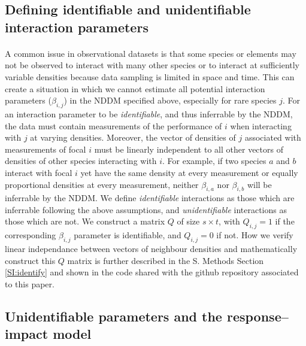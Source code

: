 \documentclass[a4,12pt]{article}
\begin{document}
\begin{refsection}
    \subsection{Defining identifiable and unidentifiable interaction parameters}
    \label{meth:id_params}

    \paragraph{}
    A common issue in observational datasets is that some species or elements may not be observed to interact with many other species or to interact at sufficiently variable densities because data sampling is limited in space and time. This can create a situation in which we cannot estimate all potential interaction parameters ($\beta_{i,j}$) in the NDDM specified above, especially for rare species $j$. For an interaction parameter to be \textit{identifiable}, and thus inferrable by the NDDM, the data must contain measurements of the performance of $i$ when interacting with $j$ at varying densities. Moreover, the vector of densities of $j$ associated with measurements of focal $i$ must be linearly independent to all other vectors of densities of other species interacting with $i$. For example, if two species $a$ and $b$ interact with focal $i$ yet have the same density at every measurement or equally proportional densities at every measurement, neither $\beta_{i, a}$ nor $\beta_{i, b}$ will be inferrable by the NDDM. We define \textit{identifiable} interactions as those which are inferrable following the above assumptions, and \textit{unidentifiable} interactions as those which are not. We construct a matrix $Q$ of size $s \times t$, with $Q_{i, j} = 1$ if the corresponding $\beta_{i, j}$ parameter is identifiable, and $Q_{i, j} = 0$ if not. How we verify linear independance between vectors of neighbour densities and mathematically construct this $Q$ matrix is further described in the S. Methods Section \ref{SI:identify} and shown in the code shared with the github repository associated to this paper.
    
    \subsection{Unidentifiable parameters and the response--impact model}
    \label{meth:rim}


\end{refsection}
\end{document}
